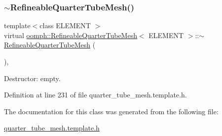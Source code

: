 \mbox{\label{classoomph_1_1RefineableQuarterTubeMesh_a229ad0335ba60176c578897b558790eb}} 
\subsubsection{\texorpdfstring{$\sim$\+Refineable\+Quarter\+Tube\+Mesh()}{~RefineableQuarterTubeMesh()}}
{\footnotesize\ttfamily template$<$class E\+L\+E\+M\+E\+NT $>$ \\
virtual \hyperlink{classoomph_1_1RefineableQuarterTubeMesh}{oomph\+::\+Refineable\+Quarter\+Tube\+Mesh}$<$ E\+L\+E\+M\+E\+NT $>$\+::$\sim$\hyperlink{classoomph_1_1RefineableQuarterTubeMesh}{Refineable\+Quarter\+Tube\+Mesh} (\begin{DoxyParamCaption}{ }\end{DoxyParamCaption})\hspace{0.3cm}{\ttfamily [inline]}, {\ttfamily [virtual]}}



Destructor\+: empty. 



Definition at line 231 of file quarter\+\_\+tube\+\_\+mesh.\+template.\+h.



The documentation for this class was generated from the following file\+:\begin{DoxyCompactItemize}
\item 
\hyperlink{quarter__tube__mesh_8template_8h}{quarter\+\_\+tube\+\_\+mesh.\+template.\+h}\end{DoxyCompactItemize}
